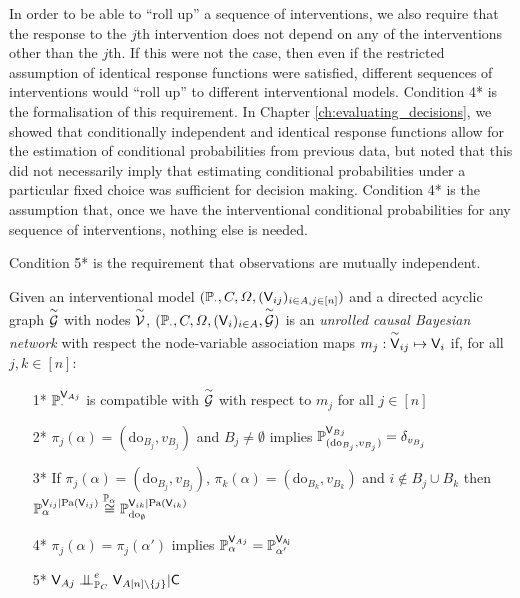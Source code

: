 In order to be able to ``roll up'' a sequence of interventions, we also require that the response to the $j$th intervention does not depend on any of the interventions other than the $j$th. If this were not the case, then even if the restricted assumption of identical response functions were satisfied, different sequences of interventions would ``roll up'' to different interventional models. Condition 4* is the formalisation of this requirement. In Chapter \ref{ch:evaluating_decisions}, we showed that conditionally independent and identical response functions allow for the estimation of conditional probabilities from previous data, but noted that this did not necessarily imply that estimating conditional probabilities under a particular fixed choice was sufficient for decision making. Condition 4* is the assumption that, once we have the interventional conditional probabilities for any sequence of interventions, nothing else is needed.

Condition 5* is the requirement that observations are mutually independent.

\begin{definition}\label{def:unr_CBN}
Given an interventional model $(\mathbb{P}_\cdot,C,\Omega,(\mathsf{V}_{ij})_{i\in A,j\in [n]})$ and a directed acyclic graph $\overset{\sim}{\mathcal{G}}$ with nodes $\overset{\sim}{\mathcal{V}}$, $(\mathbb{P}_\cdot,C,\Omega,(\mathsf{V}_i)_{i\in A},\overset{\sim}{\mathcal{G}})$  is an \emph{unrolled causal Bayesian network} with respect the node-variable association maps $m_j:\overset{\sim}{\mathsf{V}}_{ij}\mapsto \mathsf{V}_i$ if, for all $j,k\in [n]$:
\begin{itemize}
    \item [1*] $\mathbb{P}_\cdot^{\mathsf{V}_{Aj}}$ is compatible with $\overset{\sim}{\mathcal{G}}$ with respect to $m_j$ for all $j\in [n]$
    \item [2*] $\pi_j(\alpha) = (\mathrm{do}_{B_j},v_{B_j})$ and $B_j\neq \emptyset$ implies $\mathbb{P}_{(\mathrm{do}_{B_j},v_{B_j})}^{\mathsf{V}_{Bj}} = \delta_{v_{B_j}}$
    \item [3*] If $\pi_j(\alpha) = (\mathrm{do}_{B_j},v_{B_j})$, $\pi_k(\alpha) = (\mathrm{do}_{B_k},v_{B_k})$ and $i\not \in B_j\cup B_k$ then $\mathbb{P}_{\alpha}^{\mathsf{V}_{ij}|\mathrm{Pa}(\mathsf{V}_{ij})}\overset{\mathbb{P}_{\alpha}}{\cong}\mathbb{P}_{\mathrm{do}_{\emptyset}}^{\mathsf{V}_{ik}|\mathrm{Pa}(\mathsf{V}_{ik})}$
    \item [4*] $\pi_j(\alpha)=\pi_j(\alpha')$ implies $\mathbb{P}_\alpha^{\mathsf{V}_{Aj}}= \mathbb{P}_{\alpha'}^{\mathsf{V_{Aj}}}$
    \item [5*] $\RV{V}_{Aj}\CI^e_{\prob{P}_{C}} \RV{V}_{A [n]\setminus\{j\}} |\RV{C}$
\end{itemize}
\end{definition}


